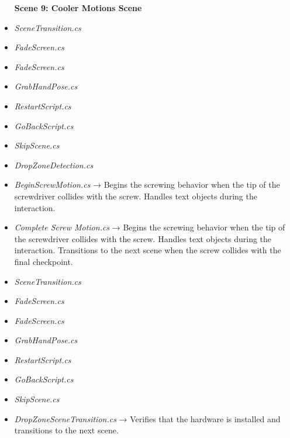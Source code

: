 \documentclass[10pt,twocolumn]{article}
\begin{document}
\begin{itemize}
    \textbf{Scene 9:  Cooler Motions Scene}\\
    \item \textit{SceneTransition.cs}\\
    \item \textit{FadeScreen.cs}
\end{itemize}

\begin{itemize}
    \textbf{Scene 10:  Cooler Install Scene}\\
    \item \textit{FadeScreen.cs}\\
    \item \textit{GrabHandPose.cs}\\
    \item \textit{RestartScript.cs}\\
    \item \textit{GoBackScript.cs}\\
    \item \textit{SkipScene.cs}\\
    \item \textit{DropZoneDetection.cs}\\
    \item \textit{BeginScrewMotion.cs} → Begins the screwing behavior when the tip of the screwdriver collides with the screw. Handles text objects during the interaction.\\
    \item \textit{Complete Screw Motion.cs} → Begins the screwing behavior when the tip of the screwdriver collides with the screw. Handles text objects during the interaction. Transitions to the next scene when the screw collides with the final checkpoint. 
\end{itemize}

\begin{itemize}
    \textbf{Scene 11:  RAM Informational Scene}\\
    \item \textit{SceneTransition.cs}\\
    \item \textit{FadeScreen.cs}
\end{itemize}

\begin{itemize}
    \textbf{Scene 12:  RAM Placement Scene}\\
    \item \textit{FadeScreen.cs}\\
    \item \textit{GrabHandPose.cs}\\
    \item \textit{RestartScript.cs}\\
    \item \textit{GoBackScript.cs}\\
    \item \textit{SkipScene.cs}\\
    \item \textit{DropZoneSceneTransition.cs} → Verifies that the hardware is installed and transitions to the next scene. 
\end{itemize}
\end{document}
